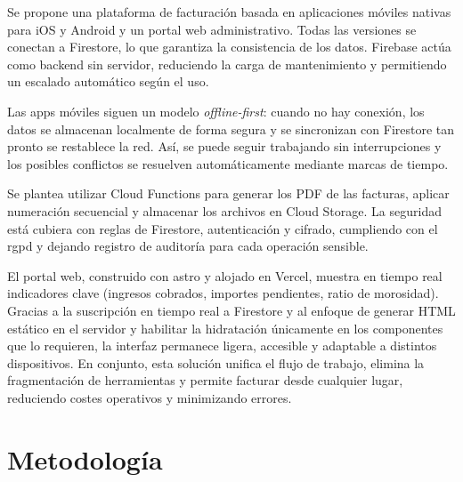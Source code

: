 \begin{large}

Se propone una plataforma de facturación basada en aplicaciones móviles nativas para iOS y Android y un portal web administrativo. Todas las versiones se conectan a Firestore, lo que garantiza la consistencia de los datos. Firebase actúa como backend sin servidor, reduciendo la carga de mantenimiento y permitiendo un escalado automático según el uso.

Las apps móviles siguen un modelo \textit{offline-first}: cuando no hay conexión, los datos se almacenan localmente de forma segura y se sincronizan con Firestore tan pronto se restablece la red. Así, se puede seguir trabajando sin interrupciones y los posibles conflictos se resuelven automáticamente mediante marcas de tiempo.

Se plantea utilizar Cloud Functions para generar los PDF de las facturas, aplicar numeración secuencial y almacenar los archivos en Cloud Storage. La seguridad está cubiera con reglas de Firestore, autenticación y cifrado, cumpliendo con el \gls{rgpd} y dejando registro de auditoría para cada operación sensible.

El portal web, construido con \gls{astro} y alojado en Vercel, muestra en tiempo real indicadores clave (ingresos cobrados, importes pendientes, ratio de morosidad). Gracias a la suscripción en tiempo real a Firestore y al enfoque de generar HTML estático en el servidor y habilitar la hidratación únicamente en los componentes que lo requieren, la interfaz permanece ligera, accesible y adaptable a distintos dispositivos. En conjunto, esta solución unifica el flujo de trabajo, elimina la fragmentación de herramientas y permite facturar desde cualquier lugar, reduciendo costes operativos y minimizando errores.

\end{large}

\section{Metodología}

